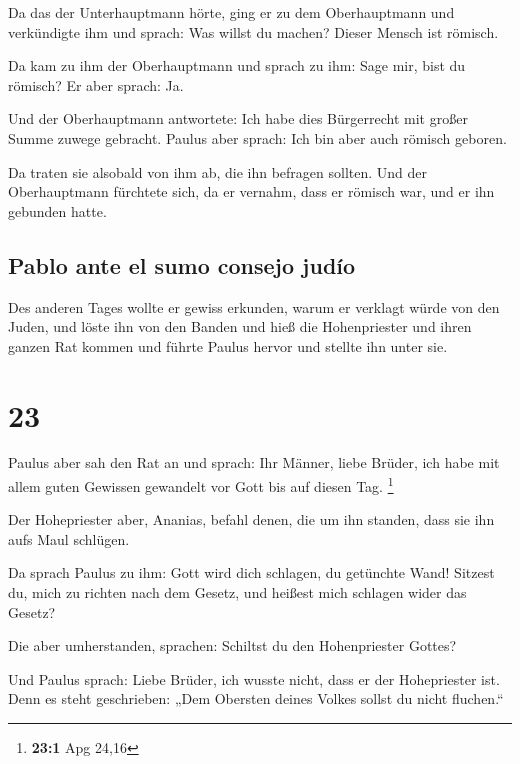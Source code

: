  Da das der Unterhauptmann hörte, ging er zu dem
Oberhauptmann und verkündigte ihm und sprach: Was willst du machen?
Dieser Mensch ist römisch.

 Da kam zu ihm der Oberhauptmann und sprach zu ihm: Sage
mir, bist du römisch? Er aber sprach: Ja.

 Und der Oberhauptmann antwortete: Ich habe dies
Bürgerrecht mit großer Summe zuwege gebracht. Paulus aber sprach: Ich
bin aber auch römisch geboren.

 Da traten sie alsobald von ihm ab, die ihn befragen
sollten. Und der Oberhauptmann fürchtete sich, da er vernahm, dass er
römisch war, und er ihn gebunden hatte.

\hypertarget{pablo-ante-el-sumo-consejo-juduxedo}{%
\subsection{Pablo ante el sumo consejo
judío}\label{pablo-ante-el-sumo-consejo-juduxedo}}

 Des anderen Tages wollte er gewiss erkunden, warum er
verklagt würde von den Juden, und löste ihn von den Banden und hieß die
Hohenpriester und ihren ganzen Rat kommen und führte Paulus hervor und
stellte ihn unter sie.

\hypertarget{section-22}{%
\section{23}\label{section-22}}

 Paulus aber sah den Rat an und sprach: Ihr Männer, liebe
Brüder, ich habe mit allem guten Gewissen gewandelt vor Gott bis auf
diesen Tag. \footnote{\textbf{23:1} Apg 24,16}

 Der Hohepriester aber, Ananias, befahl denen, die um ihn
standen, dass sie ihn aufs Maul schlügen.

 Da sprach Paulus zu ihm: Gott wird dich schlagen, du
getünchte Wand! Sitzest du, mich zu richten nach dem Gesetz, und heißest
mich schlagen wider das Gesetz?

 Die aber umherstanden, sprachen: Schiltst du den
Hohenpriester Gottes?

 Und Paulus sprach: Liebe Brüder, ich wusste nicht, dass
er der Hohepriester ist. Denn es steht geschrieben: „Dem Obersten deines
Volkes sollst du nicht fluchen.``

